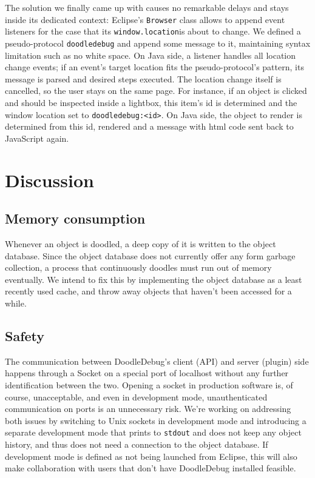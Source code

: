 \documentclass[english]{acm_proc_article-sp}
\begin{document}
The solution we finally came up with causes no remarkable delays and stays inside its dedicated context: Eclipse's \texttt{Browser} 
class allows to append event listeners for the case that its \texttt{window.location}is about to change. 
We defined a pseudo-protocol \texttt{doodledebug} and append some message to it, maintaining syntax limitation such as no white space. 
On Java side, a listener handles all location change events; if an event's target location fits the pseudo-protocol's pattern, its message is parsed and desired steps executed. 
The location change itself is cancelled, so the user stays on the same page. 
For instance, if an object is clicked and should be inspected inside a lightbox, this item's id is determined and the window location set to \texttt{doodledebug:<id>}. 
On Java side, the object to render is determined from this id, rendered and a message with html code sent back to JavaScript again.

\section{Discussion}
\subsection{Memory consumption}
Whenever an object is doodled, a deep copy of it is written to the object database. Since the object database does not currently offer any form garbage collection, a process that continuously doodles must run out of memory eventually. We intend to fix this by implementing the object database as a least recently used cache, and throw away objects that haven't been accessed for a while.

\subsection{Safety}
The communication between DoodleDebug's client (API) and server (plugin) side happens through a Socket on a special port of localhost without any further identification between the two. 
Opening a socket in production software is, of course, unacceptable, and even in development mode, unauthenticated communication on ports is an unnecessary risk. 
We're working on addressing both issues by switching to Unix sockets in development mode and introducing a separate development mode that prints to \texttt{stdout} and does not keep any object history, and thus does not need a connection to the object database. If development mode is defined as not being launched from Eclipse, this will also make collaboration with users that don't have DoodleDebug installed feasible.
\end{document}
